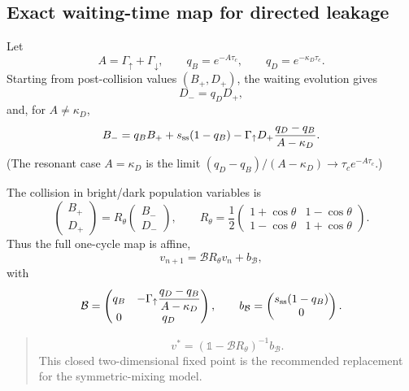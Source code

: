 \documentclass[11pt,a4paper]{article}
\newcommand{\id}{\mathbb{1}}
\newenvironment{resultbox}{\begin{quote}\small\color{blue!40!black}}{\end{quote}}
\begin{document}
\subsection{Exact waiting-time map for directed leakage}

Let
\begin{equation}
A=\Gamma_\uparrow+\Gamma_\downarrow,
\qquad
q_B=e^{-A\tau_c},
\qquad
q_D=e^{-\kappa_D\tau_c}.
\end{equation}
Starting from post-collision values $(B_+,D_+)$, the waiting evolution gives
\begin{equation}
D_-=q_DD_+,
\end{equation}
and, for $A\neq\kappa_D$,
\begin{equation}
B_-=q_B B_+ + s_{\rm ss}(1-q_B)
-\Gamma_\uparrow D_+\frac{q_D-q_B}{A-\kappa_D}.
\end{equation}
(The resonant case $A=\kappa_D$ is the limit $(q_D-q_B)/(A-\kappa_D)\to\tau_c e^{-A\tau_c}$.)

The collision in bright/dark population variables is
\begin{equation}
\begin{pmatrix}B_+\\D_+\end{pmatrix}
=R_\theta
\begin{pmatrix}B_-\\D_-\end{pmatrix},
\qquad
R_\theta=\frac12\begin{pmatrix}1+\cos\theta&1-\cos\theta\\1-\cos\theta&1+\cos\theta\end{pmatrix}.
\end{equation}
Thus the full one-cycle map is affine,
\begin{equation}
v_{n+1}=\mathcal B R_\theta v_n+b_{\mathcal B},
\end{equation}
with
\begin{equation}
\mathcal B=\begin{pmatrix}
q_B&-\Gamma_\uparrow\dfrac{q_D-q_B}{A-\kappa_D}\\
0&q_D
\end{pmatrix},
\qquad
b_{\mathcal B}=\begin{pmatrix}s_{\rm ss}(1-q_B)\\0\end{pmatrix}.
\end{equation}
\begin{resultbox}
\begin{equation}
v^*=\left(\id-\mathcal B R_\theta\right)^{-1}b_{\mathcal B}.
\end{equation}
This closed two-dimensional fixed point is the recommended replacement for the symmetric-mixing model.
\end{resultbox}
\end{document}
